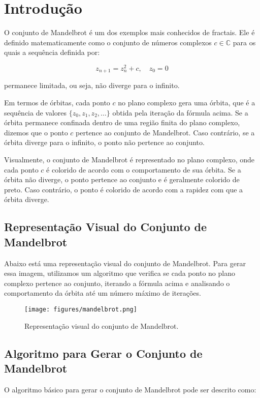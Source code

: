 \section{Introdução}
O conjunto de Mandelbrot é um dos exemplos mais conhecidos de fractais. Ele é definido matematicamente como o conjunto de números complexos $c \in \mathbb{C}$ para os quais a sequência definida por:

\[
z_{n+1} = z_n^2 + c, \quad z_0 = 0
\]

permanece limitada, ou seja, não diverge para o infinito.

Em termos de órbitas, cada ponto $c$ no plano complexo gera uma órbita, que é a sequência de valores $\{z_0, z_1, z_2, \dots\}$ obtida pela iteração da fórmula acima\cite{pereira2023}. Se a órbita permanece confinada dentro de uma região finita do plano complexo, dizemos que o ponto $c$ pertence ao conjunto de Mandelbrot. Caso contrário, se a órbita diverge para o infinito, o ponto não pertence ao conjunto.

Visualmente, o conjunto de Mandelbrot é representado no plano complexo, onde cada ponto $c$ é colorido de acordo com o comportamento de sua órbita. Se a órbita não diverge, o ponto pertence ao conjunto e é geralmente colorido de preto. Caso contrário, o ponto é colorido de acordo com a rapidez com que a órbita diverge.

\subsection{Representação Visual do Conjunto de Mandelbrot}

Abaixo está uma representação visual do conjunto de Mandelbrot. Para gerar essa imagem, utilizamos um algoritmo que verifica se cada ponto no plano complexo pertence ao conjunto, iterando a fórmula acima e analisando o comportamento da órbita até um número máximo de iterações.

\begin{figure}[h!]
\centering
\texttt{[image: figures/mandelbrot.png]}
\caption{Representação visual do conjunto de Mandelbrot.}
\label{fig:mandelbrot}
\end{figure}

\subsection{Algoritmo para Gerar o Conjunto de Mandelbrot}

O algoritmo básico para gerar o conjunto de Mandelbrot pode ser descrito como:

